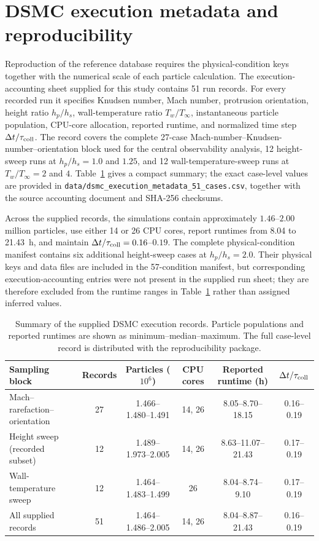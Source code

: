 \documentclass[aip,pof,preprint,floatfix,amsmath,amssymb]{revtex4-2}
\begin{document}
\clearpage
\appendix
\section{DSMC execution metadata and reproducibility}
\label{app:dsmc_execution}
Reproduction of the reference database requires the physical-condition keys together with the numerical scale of each particle calculation. The execution-accounting sheet supplied for this study contains 51 run records. For every recorded run it specifies Knudsen number, Mach number, protrusion orientation, height ratio $h_p/h_s$, wall-temperature ratio $T_w/T_\infty$, instantaneous particle population, CPU-core allocation, reported runtime, and normalized time step $\Delta t/\tau_{\rm coll}$. The record covers the complete 27-case Mach-number--Knudsen-number--orientation block used for the central observability analysis, 12 height-sweep runs at $h_p/h_s=1.0$ and $1.25$, and 12 wall-temperature-sweep runs at $T_w/T_\infty=2$ and $4$. Table~\ref{tab:dsmc_execution} gives a compact summary; the exact case-level values are provided in \texttt{data/dsmc\_execution\_metadata\_51\_cases.csv}, together with the source accounting document and SHA-256 checksums.

Across the supplied records, the simulations contain approximately $1.46$--$2.00$ million particles, use either 14 or 26 CPU cores, report runtimes from 8.04 to 21.43~h, and maintain $\Delta t/\tau_{\rm coll}=0.16$--$0.19$. The complete physical-condition manifest contains six additional height-sweep cases at $h_p/h_s=2.0$. Their physical keys and data files are included in the 57-condition manifest, but corresponding execution-accounting entries were not present in the supplied run sheet; they are therefore excluded from the runtime ranges in Table~\ref{tab:dsmc_execution} rather than assigned inferred values.

\begin{table}[h]
\centering
\caption{Summary of the supplied DSMC execution records. Particle populations and reported runtimes are shown as minimum--median--maximum. The full case-level record is distributed with the reproducibility package.}
\label{tab:dsmc_execution}
\scriptsize
\setlength{\tabcolsep}{4pt}
\begin{tabular}{lccccc}
\toprule
Sampling block & Records & Particles ($10^6$) & CPU cores & Reported runtime (h) & $\Delta t/\tau_{\rm coll}$ \\
\midrule
Mach--rarefaction--orientation & 27 & 1.466--1.480--1.491 & 14, 26 & 8.05--8.70--18.15 & 0.16--0.19 \\
Height sweep (recorded subset) & 12 & 1.489--1.973--2.005 & 14, 26 & 8.63--11.07--21.43 & 0.17--0.19 \\
Wall-temperature sweep & 12 & 1.464--1.483--1.499 & 26 & 8.04--8.74--9.10 & 0.17--0.19 \\
\midrule
All supplied records & 51 & 1.464--1.486--2.005 & 14, 26 & 8.04--8.87--21.43 & 0.16--0.19 \\
\bottomrule
\end{tabular}
\end{table}
\end{document}
